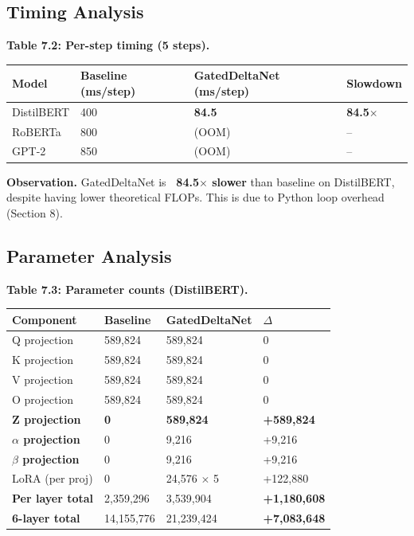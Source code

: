 \subsection{Timing Analysis}

\textbf{Table 7.2: Per-step timing (5 steps).}

\begin{table}[H]
\centering
\small
\begin{tabular}{llll}
\toprule
\textbf{Model} & \textbf{Baseline (ms/step)} & \textbf{GatedDeltaNet (ms/step)} & \textbf{Slowdown} \\
\midrule
DistilBERT & 400 & \textbf{84.5} & \textbf{84.5$\times$} \\
RoBERTa & 800 & (OOM) & -- \\
GPT-2 & 850 & (OOM) & -- \\
\bottomrule
\end{tabular}
\end{table}

\textbf{Observation.} GatedDeltaNet is \textbf{~84.5$\times$ slower} than baseline 
on DistilBERT, despite having lower theoretical FLOPs. This is due to Python 
loop overhead (Section 8).

\subsection{Parameter Analysis}

\textbf{Table 7.3: Parameter counts (DistilBERT).}

\begin{table}[H]
\centering
\small
\begin{tabular}{llll}
\toprule
\textbf{Component} & \textbf{Baseline} & \textbf{GatedDeltaNet} & \textbf{$\Delta$} \\
\midrule
Q projection & 589,824 & 589,824 & 0 \\
K projection & 589,824 & 589,824 & 0 \\
V projection & 589,824 & 589,824 & 0 \\
O projection & 589,824 & 589,824 & 0 \\
\textbf{Z projection} & \textbf{0} & \textbf{589,824} & \textbf{+589,824} \\
\textbf{$\alpha$ projection} & 0 & 9,216 & +9,216 \\
\textbf{$\beta$ projection} & 0 & 9,216 & +9,216 \\
LoRA (per proj) & 0 & 24,576 $\times$ 5 & +122,880 \\
\textbf{Per layer total} & 2,359,296 & 3,539,904 & \textbf{+1,180,608} \\
\textbf{6-layer total} & 14,155,776 & 21,239,424 & \textbf{+7,083,648} \\
\bottomrule
\end{tabular}
\end{table}


